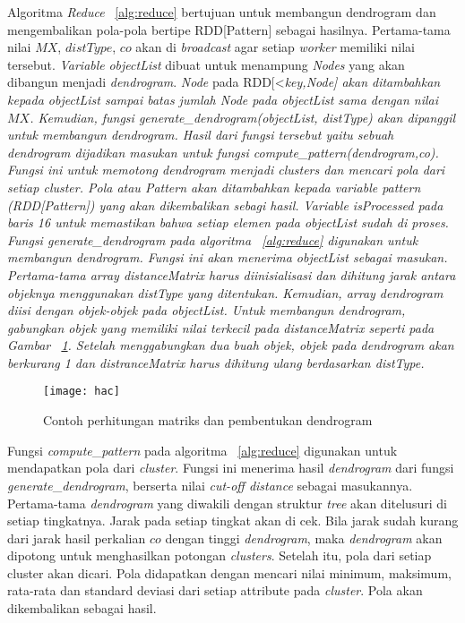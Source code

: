 Algoritma \textit{Reduce} ~\ref{alg:reduce} bertujuan untuk membangun dendrogram dan mengembalikan pola-pola bertipe RDD[Pattern] sebagai hasilnya. Pertama-tama nilai $MX$, $distType$, $co$ akan di \textit{broadcast} agar setiap \textit{worker} memiliki nilai tersebut. \textit{Variable} \textit{objectList} dibuat untuk menampung \textit{Nodes} yang akan dibangun menjadi \textit{dendrogram}. \textit{Node} pada RDD[<\it{key},\it{Node}] akan ditambahkan kepada objectList sampai batas jumlah \textit{Node} pada objectList sama dengan nilai $MX$. Kemudian, fungsi \textit{generate\_dendrogram(objectList, distType)} akan dipanggil untuk membangun \it{dendrogram}. Hasil dari fungsi tersebut yaitu sebuah \textit{dendrogram} dijadikan masukan untuk fungsi \textit{compute\_pattern(dendrogram,co)}. Fungsi ini untuk memotong \it{dendrogram} menjadi \textit{clusters} dan mencari pola dari setiap \textit{cluster}. Pola atau \textit{Pattern} akan ditambahkan kepada \textit{variable pattern} (RDD[\it{Pattern}]) yang akan dikembalikan sebagi hasil. \textit{Variable isProcessed} pada baris 16 untuk memastikan bahwa setiap elemen pada \textit{objectList} sudah di proses. \\


Fungsi \textit{generate}\_\textit{dendrogram} pada algoritma ~\ref{alg:reduce} digunakan untuk membangun \textit{dendrogram}. Fungsi ini akan menerima \textit{objectList} sebagai masukan. Pertama-tama \textit{array} distanceMatrix harus diinisialisasi dan dihitung jarak antara objeknya menggunakan \textit{distType} yang ditentukan. Kemudian, \textit{array} \textit{dendrogram} diisi dengan objek-objek pada \textit{objectList}. Untuk membangun dendrogram, gabungkan objek yang memiliki nilai terkecil pada \textit{distanceMatrix} seperti pada Gambar ~\ref{fig:hac}. Setelah menggabungkan dua buah objek, objek pada dendrogram akan berkurang 1 dan \textit{distranceMatrix} harus dihitung ulang berdasarkan \textit{distType}.

\begin{figure}[H]
    \centering  
    \texttt{[image: hac]}  
    \caption[Contoh perhitungan matriks dan pembentukan dendrogram]{Contoh perhitungan matriks dan pembentukan dendrogram} 
    \label{fig:hac}
\end{figure}

Fungsi \textit{compute}\_\textit{pattern} pada algoritma ~\ref{alg:reduce} digunakan untuk mendapatkan pola dari \textit{cluster}. Fungsi ini menerima hasil \textit{dendrogram} dari fungsi \textit{generate}\_\textit{dendrogram}, berserta nilai \textit{cut-off distance} sebagai masukannya. Pertama-tama \textit{dendrogram} yang diwakili dengan struktur \textit{tree} akan ditelusuri di setiap tingkatnya. Jarak pada setiap tingkat akan di cek. Bila jarak sudah kurang dari jarak hasil perkalian $co$ dengan tinggi \textit{dendrogram}, maka \textit{dendrogram} akan dipotong untuk menghasilkan potongan \textit{clusters}. Setelah itu, pola dari setiap cluster akan dicari. Pola didapatkan dengan mencari nilai minimum, maksimum, rata-rata dan standard deviasi dari setiap attribute pada \textit{cluster}. Pola akan dikembalikan sebagai hasil.

